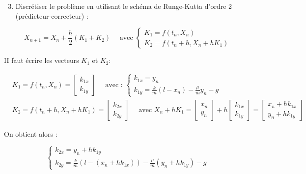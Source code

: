 \documentclass[10pt]{article}
\begin{document}
\begin{enumerate}
  \setcounter{enumi}{2}
  \item Discrétiser le problème en utilisant le schéma de Runge-Kutta d'ordre 2 (prédicteur-correcteur) :
\end{enumerate}

\[
X_{n+1}=X_{n}+\frac{h}{2}\left(K_{1}+K_{2}\right) \quad \text { avec }\left\{\begin{array}{c}
K_{1}=f\left(t_{n}, X_{n}\right) \\
K_{2}=f\left(t_{n}+h, X_{n}+h K_{1}\right)
\end{array}\right.
\]

II faut écrire les vecteurs \(K_{1}\) et \(K_{2}:\)

\[
\begin{aligned}
& K_{1}=f\left(t_{n}, X_{n}\right)=\left[\begin{array}{l}
k_{1 x} \\
k_{1 y}
\end{array}\right] \quad \text { avec : }\left\{\begin{array}{c}
k_{1 x}=y_{n} \\
k_{1 y}=\frac{k}{m}\left(l-x_{n}\right)-\frac{\mu}{m} y_{n}-g
\end{array}\right. \\
& K_{2}=f\left(t_{n}+h, X_{n}+h K_{1}\right)=\left[\begin{array}{l}
k_{2 x} \\
k_{2 y}
\end{array}\right] \quad \text { avec } X_{n}+h K_{1}=\left[\begin{array}{l}
x_{n} \\
y_{n}
\end{array}\right]+h\left[\begin{array}{l}
k_{1 x} \\
k_{1 y}
\end{array}\right]=\left[\begin{array}{l}
x_{n}+h k_{1 x} \\
y_{n}+h k_{1 y}
\end{array}\right]
\end{aligned}
\]

On obtient alors :

\[
\left\{\begin{array}{c}
k_{2 x}=y_{n}+h k_{1 y} \\
k_{2 y}=\frac{k}{m}\left(l-\left(x_{n}+h k_{1 x}\right)\right)-\frac{\mu}{m}\left(y_{n}+h k_{1 y}\right)-g
\end{array}\right.
\]
\end{document}
